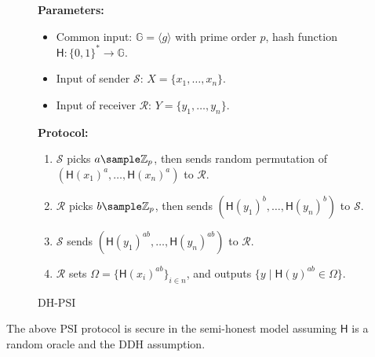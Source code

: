 \begin{figure}[!hbtp]
\begin{framed}
\begin{minipage}[center]{\textwidth}
\begin{trivlist}
\item \textbf{Parameters:} 
\begin{itemize}
    \item Common input: $\mathbb{G} = \langle g \rangle$ with prime order $p$, 
        hash function $\mathsf{H}: \{0,1\}^* \rightarrow \mathbb{G}$. 

    \item Input of sender $\mathcal{S}$: $X = \{x_1, \dots, x_n\}$.

    \item Input of receiver $\mathcal{R}$: $Y = \{y_1, \dots, y_n\}$. 
\end{itemize}

\item \textbf{Protocol:}
\begin{enumerate}
\item $\mathcal{S}$ picks $a \sample \mathbb{Z}_p$, 
    then sends random permutation of $(\mathsf{H}(x_1)^a, \dots, \mathsf{H}(x_n)^a)$ to $\mathcal{R}$. 
\item $\mathcal{R}$ picks $b \sample \mathbb{Z}_p$, then sends $(\mathsf{H}(y_1)^b, \dots, \mathsf{H}(y_n)^b)$ to $\mathcal{S}$.
\item $\mathcal{S}$ sends $(\mathsf{H}(y_1)^{ab}, \dots, \mathsf{H}(y_n)^{ab})$ to $\mathcal{R}$. 
\item $\mathcal{R}$ sets $\Omega = \{\mathsf{H}(x_i)^{ab}\}_{i \in n}$, 
    and outputs $\{y \mid \mathsf{H}(y)^{ab} \in \Omega\}$.
\end{enumerate}
\end{trivlist}
\end{minipage}
\end{framed}
\caption{DH-PSI}\label{fig:DH-PSI}
\end{figure}

\begin{theorem}
The above PSI protocol is secure in the semi-honest model assuming $\mathsf{H}$ is a random oracle and the DDH assumption.
\end{theorem}

